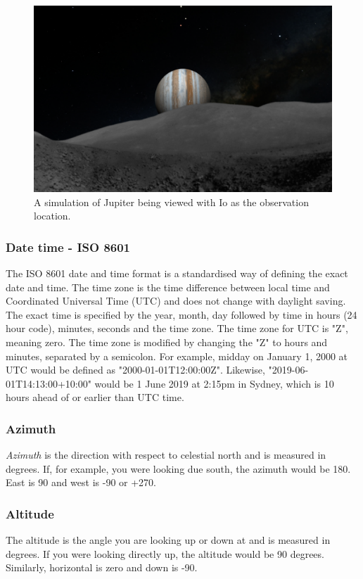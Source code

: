 \begin{figure}[ht]
	\centerline{\includegraphics[width=1\columnwidth]{JupiterFromIO.png}}
	\caption{\label{fig_JupiterFromIO}{A simulation of Jupiter being viewed with Io as the observation location.}}
\end{figure}

\subsubsection{Date time - ISO 8601}
The ISO 8601 date and time format is a standardised way of defining the exact date and time. The time zone is the time difference between local time and Coordinated Universal Time (UTC) and does not change with daylight saving. The exact time is specified by the year, month, day followed by time in hours (24 hour code), minutes, seconds and the time zone.  The time zone for UTC is "Z", meaning zero. The time zone is modified by changing the "Z" to hours and minutes, separated by a semicolon. For example,  midday on January 1, 2000 at UTC would be defined as "2000-01-01T12:00:00Z". Likewise, "2019-06-01T14:13:00+10:00" would be 1 June 2019 at 2:15pm in Sydney, which is 10 hours ahead of or earlier than UTC time. 

\subsubsection{Azimuth}
\textit{Azimuth} is the direction with respect to celestial north and is measured in degrees. If, for example, you were looking due south, the azimuth would be 180. East is 90 and west is -90 or +270. 

\subsubsection{Altitude}
The altitude is the angle you are looking up or down at and is measured in degrees. If you were looking directly up, the altitude would be 90 degrees. Similarly, horizontal is zero and down is -90.

